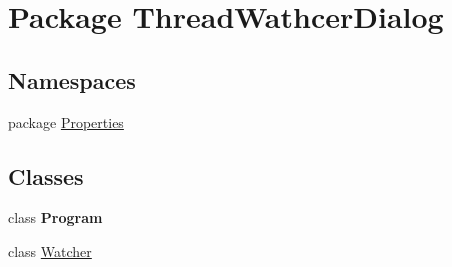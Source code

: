 \hypertarget{namespace_thread_wathcer_dialog}{\section{Package Thread\+Wathcer\+Dialog}
\label{namespace_thread_wathcer_dialog}
}
\subsection*{Namespaces}
\begin{DoxyCompactItemize}
\item 
package \hyperlink{namespace_thread_wathcer_dialog_1_1_properties}{Properties}
\end{DoxyCompactItemize}
\subsection*{Classes}
\begin{DoxyCompactItemize}
\item 
class {\bfseries Program}
\item 
class \hyperlink{class_thread_wathcer_dialog_1_1_watcher}{Watcher}
\end{DoxyCompactItemize}
